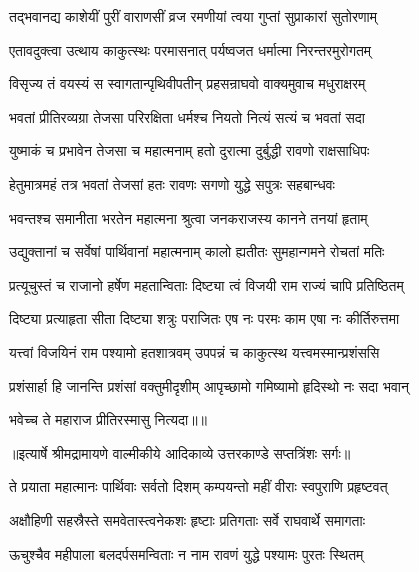\twolineshloka
{तद्भवानद्य काशेयीं पुरीं वाराणसीं व्रज}
{रमणीयां त्वया गुप्तां सुप्राकारां सुतोरणाम्} %

\twolineshloka
{एतावदुक्त्वा उत्थाय काकुत्स्थः परमासनात्}
{पर्यष्वजत धर्मात्मा निरन्तरमुरोगतम्} %

\twolineshloka
{विसृज्य तं वयस्यं स स्वागतान्पृथिवीपतीन्}
{प्रहसन्राघवो वाक्यमुवाच मधुराक्षरम्} %

\twolineshloka
{भवतां प्रीतिरव्यग्रा तेजसा परिरक्षिता}
{धर्मश्च नियतो नित्यं सत्यं च भवतां सदा} %

\twolineshloka
{युष्माकं च प्रभावेन तेजसा च महात्मनाम्}
{हतो दुरात्मा दुर्बुद्धी रावणो राक्षसाधिपः} %

\twolineshloka
{हेतुमात्रमहं तत्र भवतां तेजसां हतः}
{रावणः सगणो युद्धे सपुत्रः सहबान्धवः} %

\twolineshloka
{भवन्तश्च समानीता भरतेन महात्मना}
{श्रुत्वा जनकराजस्य कानने तनयां हृताम्} %

\twolineshloka
{उद्युक्तानां च सर्वेषां पार्थिवानां महात्मनाम्}
{कालो ह्यतीतः सुमहान्गमने रोचतां मतिः} %

\twolineshloka
{प्रत्यूचुस्तं च राजानो हर्षेण महतान्विताः}
{दिष्ट्या त्वं विजयी राम राज्यं चापि प्रतिष्ठितम्} %

\twolineshloka
{दिष्ट्या प्रत्याहृता सीता दिष्ट्या शत्रुः पराजितः}
{एष नः परमः काम एषा नः कीर्तिरुत्तमा} %

\twolineshloka
{यत्त्वां विजयिनं राम पश्यामो हतशात्रवम्}
{उपपन्नं च काकुत्स्थ यत्त्वमस्मान्प्रशंससि} %

\twolineshloka
{प्रशंसार्हा हि जानन्ति प्रशंसां वक्तुमीदृशीम्}
{आपृच्छामो गमिष्यामो हृदिस्थो नः सदा भवान्} %

{भवेच्च ते महाराज प्रीतिरस्मासु नित्यदा॥॥} %

\addtocounter{shlokacount}{1}


{॥इत्यार्षे श्रीमद्रामायणे वाल्मीकीये आदिकाव्ये उत्तरकाण्डे सप्तत्रिंशः सर्गः॥}


\twolineshloka
{ते प्रयाता महात्मानः पार्थिवाः सर्वतो दिशम्}
{कम्पयन्तो महीं वीराः स्वपुराणि प्रहृष्टवत्} %

\twolineshloka
{अक्षौहिणी सहस्रैस्ते समवेतास्त्वनेकशः}
{हृष्टाः प्रतिगताः सर्वे राघवार्थे समागताः} %

\twolineshloka
{ऊचुश्चैव महीपाला बलदर्पसमन्विताः}
{न नाम रावणं युद्धे पश्यामः पुरतः स्थितम्} %

